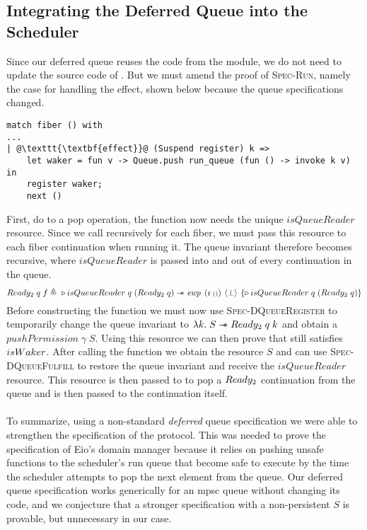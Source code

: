 \subsection{Integrating the Deferred Queue into the Scheduler}
Since our deferred queue reuses the code from the  module, we do not need to update the source code of .
But we must amend the proof of \textsc{Spec-Run}, namely the case for handling the \esuspend{} effect, shown below because the queue specifications changed.
\begin{verbatim}
match fiber () with
...
| @\texttt{\textbf{effect}}@ (Suspend register) k =>
    let waker = fun v -> Queue.push run_queue (fun () -> invoke k v) in
    register waker;
    next ()
\end{verbatim}
First, do to a pop operation, the  function now needs the unique \(isQueueReader\) resource.
Since we call  recursively for each fiber, we must pass this resource to each fiber continuation when running it.
The queue invariant therefore becomes recursive, where \(isQueueReader\) is passed into and out of every continuation in the queue.
\[
  \gsReady{2}\; q\; f \triangleq\; \later isQueueReader\; q\; (\gsReady{2}\; q) \wand \ewp{f\; ()}{\bot}{\later isQueueReader\; q\; (\gsReady{2}\; q)}
\]
Before constructing the  function we must now use \textsc{Spec-DQueueRegister} to temporarily change the queue invariant to \(\lambda k.\; S \mathrel{-\!\!\ast} Ready_{2}\; q\; k\) and obtain a \(pushPermission\; \gamma\; S\).
Using this resource we can then prove that  still satisfies \(isWaker_{}\).
After calling the  function we obtain the resource \(S\) and can use \textsc{Spec-DQueueFulfill} to restore the queue invariant and receive the \(isQueueReader\) resource.
This resource is then passed to  to pop a \(Ready_{2}\) continuation from the queue and is then passed to the continuation itself.

\paragraph*{}
To summarize, using a non-standard \emph{deferred} queue specification we were able to strengthen the specification of the \esuspend{} protocol.
This was needed to prove the specification of Eio's domain manager because it relies on pushing unsafe functions to the scheduler's run queue that become safe to execute by the time the scheduler attempts to pop the next element from the queue.
Our deferred queue specification works generically for an mpsc queue without changing its code, and we conjecture that a stronger specification with a non-persistent \(S\) is provable, but unnecessary in our case.

